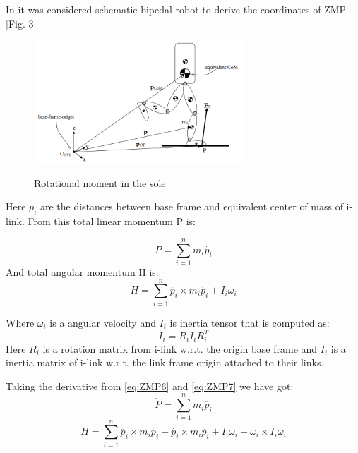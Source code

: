 \documentclass[11pt,a4paper]{report}
\begin{document}
		In \cite{dekker2009zero} it was considered schematic bipedal robot to derive the coordinates of ZMP [Fig. 3]

		\begin{figure}[h!]
			\vspace{-0.2cm}
			\centering
			{\includegraphics[width=0.7\textwidth]{3}}
			\caption{Rotational moment in the sole \cite{dekker2009zero}}
			\label{fig:3}
			\vspace{-0.1cm}
		\end{figure}

		Here $p_i$ are the distances between base frame and equivalent center of mass of i-link. From this total linear momentum P is:
	
		\begin{equation} \label{eq:ZMP6}
			P = \sum^n_{i=1}{m_i \dot{p_i}}
		\end{equation}
		And total angular momentum H is:
		\begin{equation} \label{eq:ZMP7}
			H = \sum^n_{i=1}{\dot{p_i} \times m_i \dot{p_i} + I_i \omega_i}
		\end{equation}

		Where $\omega_i$ is a angular velocity and $I_i$ is inertia tensor that is computed as:
		\begin{equation} \label{eq:ZMP8}
			I_i = R_i I_i R_i^T
		\end{equation}
		Here $R_i$ is a rotation matrix from i-link w.r.t. the origin base frame and $I_i$ is a inertia matrix of i-link w.r.t. the link frame origin attached to their links.

		Taking the derivative from \ref{eq:ZMP6} and \ref{eq:ZMP7} we have got:
		\begin{equation} \label{eq:ZMP9}
			\dot{P} = \sum^n_{i=1}{m_i \ddot{p_i}}
		\end{equation}
		\begin{equation} \label{eq:ZMP10}
			\dot{H} = \sum^n_{i=1}{\ddot{p_i} \times m_i \dot{p_i} + \dot{p_i} \times m_i \ddot{p_i} + I_i \dot{\omega_i}} + \omega_i \times I_i \omega_i
		\end{equation}
\end{document}
